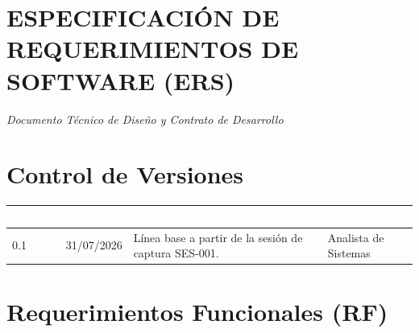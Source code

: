 \section*{ESPECIFICACIÓN DE REQUERIMIENTOS DE\\SOFTWARE (ERS)}
\begin{center}
\textit{Documento Técnico de Diseño y Contrato de Desarrollo}
\end{center}

\section{Control de Versiones}

\begin{tabularx}{\textwidth}{p{}p{}Xp{}}
\toprule
\rowcolor{azulprincipal}\textcolor{white}{Versión} & \textcolor{white}{Fecha} & \textcolor{white}{Descripción del Cambio} & \textcolor{white}{Autor}\\
\midrule
0.1 & 31/07/2026 & Línea base a partir de la sesión de captura SES-001. & Analista de Sistemas\\
\bottomrule
\end{tabularx}

\section{Requerimientos Funcionales (RF)}

